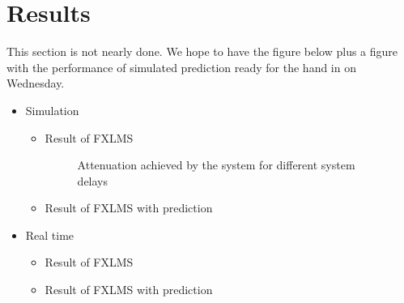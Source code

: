 \section{Results}
This section is not nearly done. We hope to have the figure below plus a figure with the performance of simulated prediction ready for the hand in on Wednesday. 
\begin{itemize}
\item Simulation
\begin{itemize}
\item Result of FXLMS
\begin{figure}[H]
	\centering
	
	\caption{Attenuation achieved by the system for different system delays}
	\label{Fig:Reference to noise ratio}
\end{figure}
\item Result of FXLMS with prediction
\end{itemize}
\item Real time 
\begin{itemize}
\item Result of FXLMS
\item Result of FXLMS with prediction
\end{itemize}
\end{itemize} 

